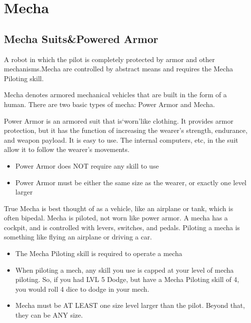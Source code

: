\documentclass[twoside]{book}
\begin{document}
\begin{multicols}{2}
    
\end{multicols}
  
    

\chapter{Mecha}
    
    

\section{Mecha Suits\&Powered Armor}
    
    {  
    A robot in which the pilot is completely protected by armor and other mechanisms.Mecha are controlled by abstract means and requires the Mecha Piloting skill.
    }
  
    {  
    Mecha denotes armored mechanical vehicles that are built in the form of a human. There are two basic types of mecha: Power Armor and Mecha.
    }
  
    {  
    Power Armor is an armored suit that is`worn'like clothing. It provides armor protection, but it has the function of increasing the wearer's strength, endurance, and weapon payload. It is easy to use. The internal computers, etc, in the suit allow it to follow the wearer's movements.
    }
  
\begin{itemize}
      
  \item Power Armor does NOT require any skill to use
  \item Power Armor must be either the same size as the wearer, or exactly one level larger
\end{itemize}
  
    {  
    True Mecha is best thought of as a vehicle, like an airplane or tank, which is often bipedal. Mecha is piloted, not worn like power armor. A mecha has a cockpit, and is controlled with levers, switches, and pedals. Piloting a mecha is something like flying an airplane or driving a car.
    }
  
\begin{itemize}
      
  \item The Mecha Piloting skill is required to operate a mecha
  \item When piloting a mech, any skill you use is capped at your level of mecha piloting. So, if you had LVL 5 Dodge, but have a Mecha Piloting skill of 4, you would roll 4 dice to dodge in your mech.
  \item Mecha must be AT LEAST one size level larger than the pilot. Beyond that, they can be ANY size.
\end{itemize}
  
\end{document}
